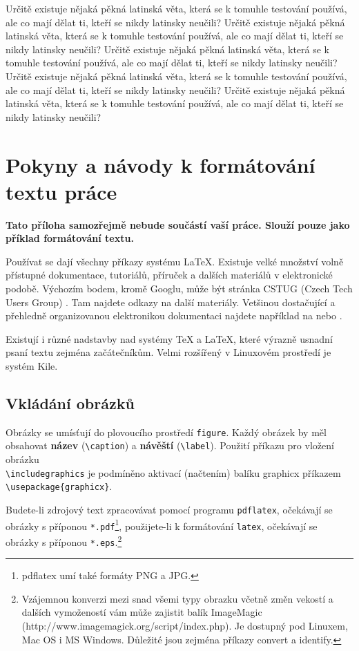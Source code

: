\documentclass[11pt,twoside,a4paper]{book}
\begin{document}
Určitě existuje nějaká pěkná latinská věta, která se k tomuhle testování používá, ale co mají dělat ti, kteří se nikdy latinsky neučili? Určitě existuje nějaká pěkná latinská věta, která se k tomuhle testování používá, ale co mají dělat ti, kteří se nikdy latinsky neučili? Určitě existuje nějaká pěkná latinská věta, která se k tomuhle testování používá, ale co mají dělat ti, kteří se nikdy latinsky neučili? Určitě existuje nějaká pěkná latinská věta, která se k tomuhle testování používá, ale co mají dělat ti, kteří se nikdy latinsky neučili? Určitě existuje nějaká pěkná latinská věta, která se k tomuhle testování používá, ale co mají dělat ti, kteří se nikdy latinsky neučili?

\chapter{Pokyny a návody k formátování textu práce}
\textbf{\large Tato příloha samozřejmě nebude součástí vaší práce. Slouží pouze jako příklad formátování textu.}

Používat se dají všechny příkazy systému \LaTeX. Existuje velké množství volně přístupné dokumentace, tutoriálů, příruček a dalších materiálů v elektronické podobě. Výchozím bodem, kromě Googlu, může být stránka CSTUG (Czech Tech Users Group) \cite{CSTUG}. Tam najdete odkazy na další materiály.  Vetšinou dostačující a přehledně organizovanou elektronikou dokumentaci najdete například na \cite{latexdocweb} nebo \cite{latexwiki}.

Existují i různé nadstavby nad systémy \TeX{} a \LaTeX, které výrazně usnadní psaní textu zejména začátečníkům. Velmi rozšířený v Linuxovém prostředí je systém Kile.


\section{Vkládání obrázků}
Obrázky se umísťují do plovoucího prostředí \verb|figure|. Každý obrázek by měl obsahovat \textbf{název} (\verb|\caption|) a \textbf{návěští} (\verb|\label|). Použití příkazu pro vložení obrázku \\\verb|\includegraphics| je podmíněno aktivací (načtením) balíku graphicx příkazem\\ \verb|\usepackage{graphicx}|.

Budete-li zdrojový text zpracovávat pomocí programu \verb|pdflatex|, očekávají se obrázky s příponou \verb|*.pdf|\footnote{pdflatex umí také formáty PNG a JPG.}, použijete-li k formátování \verb|latex|, očekávají se obrázky s příponou \verb|*.eps|.\footnote{Vzájemnou konverzi mezi snad všemi typy obrazku včetně změn vekostí a dalších vymožeností vám může zajistit balík ImageMagic  (http://www.imagemagick.org/script/index.php). Je dostupný pod Linuxem, Mac OS i MS Windows. Důležité jsou zejména příkazy convert a identify.}
\end{document}
